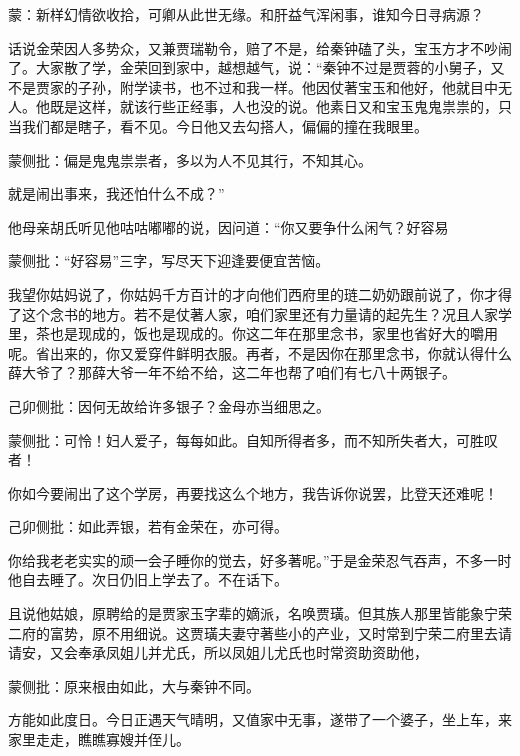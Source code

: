 \begin{parag}
    \begin{note}蒙：新样幻情欲收拾，可卿从此世无缘。和肝益气浑闲事，谁知今日寻病源？\end{note}
\end{parag}


\begin{parag}
    话说金荣因人多势众，又兼贾瑞勒令，赔了不是，给秦钟磕了头，宝玉方才不吵闹了。大家散了学，金荣回到家中，越想越气，说：“秦钟不过是贾蓉的小舅子，又不是贾家的子孙，附学读书，也不过和我一样。他因仗著宝玉和他好，他就目中无人。他既是这样，就该行些正经事，人也没的说。他素日又和宝玉鬼鬼祟祟的，只当我们都是瞎子，看不见。今日他又去勾搭人，偏偏的撞在我眼里。\begin{note}蒙侧批：偏是鬼鬼祟祟者，多以为人不见其行，不知其心。\end{note}就是闹出事来，我还怕什么不成？”
\end{parag}


\begin{parag}
    他母亲胡氏听见他咕咕嘟嘟的说，因问道：“你又要争什么闲气？好容易\begin{note}蒙侧批：“好容易”三字，写尽天下迎逢要便宜苦恼。\end{note}我望你姑妈说了，你姑妈千方百计的才向他们西府里的琏二奶奶跟前说了，你才得了这个念书的地方。若不是仗著人家，咱们家里还有力量请的起先生？况且人家学里，茶也是现成的，饭也是现成的。你这二年在那里念书，家里也省好大的嚼用呢。省出来的，你又爱穿件鲜明衣服。再者，不是因你在那里念书，你就认得什么薛大爷了？那薛大爷一年不给不给，这二年也帮了咱们有七八十两银子。\begin{note}己卯侧批：因何无故给许多银子？金母亦当细思之。\end{note}\begin{note}蒙侧批：可怜！妇人爱子，每每如此。自知所得者多，而不知所失者大，可胜叹者！\end{note}你如今要闹出了这个学房，再要找这么个地方，我告诉你说罢，比登天还难呢！\begin{note}己卯侧批：如此弄银，若有金荣在，亦可得。\end{note}你给我老老实实的顽一会子睡你的觉去，好多著呢。”于是金荣忍气吞声，不多一时他自去睡了。次日仍旧上学去了。不在话下。
\end{parag}


\begin{parag}
    且说他姑娘，原聘给的是贾家玉字辈的嫡派，名唤贾璜。但其族人那里皆能象宁荣二府的富势，原不用细说。这贾璜夫妻守著些小的产业，又时常到宁荣二府里去请请安，又会奉承凤姐儿并尤氏，所以凤姐儿尤氏也时常资助资助他，\begin{note}蒙侧批：原来根由如此，大与秦钟不同。\end{note}方能如此度日。今日正遇天气晴明，又值家中无事，遂带了一个婆子，坐上车，来家里走走，瞧瞧寡嫂并侄儿。
\end{parag}


